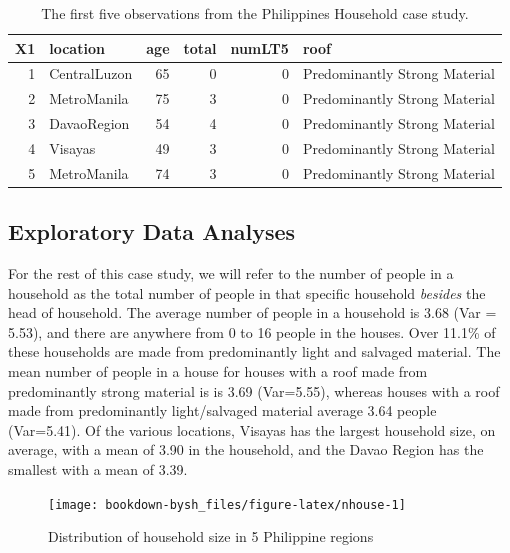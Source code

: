\documentclass[
]{krantz}
\begin{document}
\begin{table}

\caption{\label{tab:fHH1table1}The first five observations from the Philippines Household case study.}
\centering
\begin{tabular}[t]{rlrrrl}
\toprule
X1 & location & age & total & numLT5 & roof\\
\midrule
1 & CentralLuzon & 65 & 0 & 0 & Predominantly Strong Material\\
2 & MetroManila & 75 & 3 & 0 & Predominantly Strong Material\\
3 & DavaoRegion & 54 & 4 & 0 & Predominantly Strong Material\\
4 & Visayas & 49 & 3 & 0 & Predominantly Strong Material\\
5 & MetroManila & 74 & 3 & 0 & Predominantly Strong Material\\
\bottomrule
\end{tabular}
\end{table}

\hypertarget{exploreHH}{%
\subsection{Exploratory Data Analyses}\label{exploreHH}}

For the rest of this case study, we will refer to the number of people in a household as the total number of people in that specific household \emph{besides} the head of household. The average number of people in a household is 3.68 (Var = 5.53), and there are anywhere from 0 to 16 people in the houses. Over 11.1\% of these households are made from predominantly light and salvaged material. The mean number of people in a house for houses with a roof made from predominantly strong material is is 3.69 (Var=5.55), whereas houses with a roof made from predominantly light/salvaged material average 3.64 people (Var=5.41). Of the various locations, Visayas has the largest household size, on average, with a mean of 3.90 in the household, and the Davao Region has the smallest with a mean of 3.39.

\begin{figure}

{\centering \texttt{[image: bookdown-bysh\_files/figure-latex/nhouse-1]} 

}

\caption{Distribution of household size in 5 Philippine regions}\label{fig:nhouse}
\end{figure}
\end{document}
